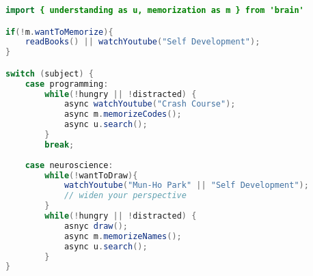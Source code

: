 \begin{lstlisting}[breaklines=true, 
    basicstyle=\small, 
    language=java, 
    showstringspaces=false]
import { understanding as u, memorization as m } from 'brain'

if(!m.wantToMemorize){
    readBooks() || watchYoutube("Self Development");
}

switch (subject) {
    case programming:
        while(!hungry || !distracted) {
            async watchYoutube("Crash Course");
            async m.memorizeCodes();
            async u.search();
        }
        break;
    
    case neuroscience:
        while(!wantToDraw){
            watchYoutube("Mun-Ho Park" || "Self Development"); 
            // widen your perspective
        }
        while(!hungry || !distracted) {
            asnyc draw();
            async m.memorizeNames();
            async u.search();
        }
}
\end{lstlisting}